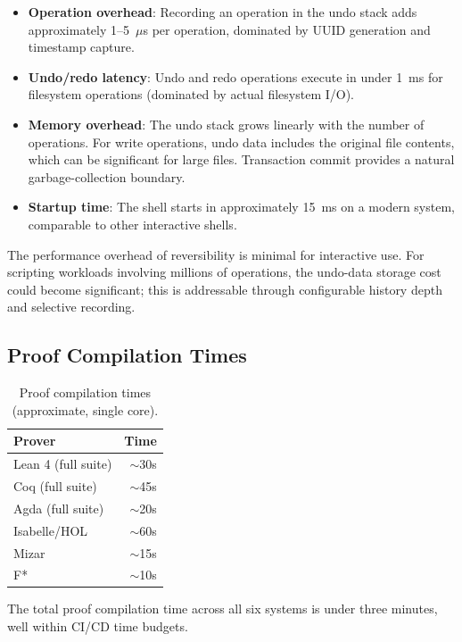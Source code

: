 \documentclass[11pt,a4paper]{article}
\begin{document}
\begin{itemize}
  \item \textbf{Operation overhead}: Recording an operation in the undo stack
        adds approximately 1--5~$\mu$s per operation, dominated by UUID
        generation and timestamp capture.
  \item \textbf{Undo/redo latency}: Undo and redo operations execute in under
        1~ms for filesystem operations (dominated by actual filesystem I/O).
  \item \textbf{Memory overhead}: The undo stack grows linearly with the
        number of operations. For write operations, undo data includes the
        original file contents, which can be significant for large files.
        Transaction commit provides a natural garbage-collection boundary.
  \item \textbf{Startup time}: The shell starts in approximately 15~ms on a
        modern system, comparable to other interactive shells.
\end{itemize}

The performance overhead of reversibility is minimal for interactive use.
For scripting workloads involving millions of operations, the undo-data
storage cost could become significant; this is addressable through configurable
history depth and selective recording.

\subsection{Proof Compilation Times}

\begin{table}[t]
\centering
\caption{Proof compilation times (approximate, single core).}
\label{tab:proof-times}
\begin{tabular}{@{}lr@{}}
\toprule
\textbf{Prover} & \textbf{Time} \\
\midrule
Lean 4 (full suite)    & $\sim$30s \\
Coq (full suite)       & $\sim$45s \\
Agda (full suite)      & $\sim$20s \\
Isabelle/HOL           & $\sim$60s \\
Mizar                  & $\sim$15s \\
F*                     & $\sim$10s \\
\bottomrule
\end{tabular}
\end{table}

The total proof compilation time across all six systems is under three minutes,
well within CI/CD time budgets.
\end{document}

